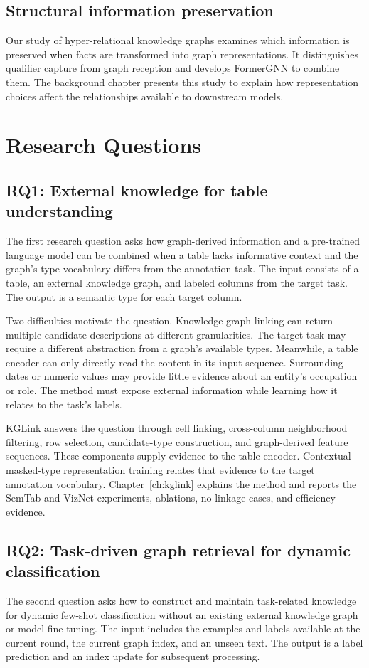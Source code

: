 \subsection{Structural information preservation}
Our study of hyper-relational knowledge graphs examines which information is preserved when facts are transformed into graph representations. It distinguishes qualifier capture from graph reception and develops FormerGNN to combine them. The background chapter presents this study to explain how representation choices affect the relationships available to downstream models.

\section{Research Questions}
\label{sec:introduction:questions}
\subsection{RQ1: External knowledge for table understanding}
The first research question asks how graph-derived information and a pre-trained language model can be combined when a table lacks informative context and the graph's type vocabulary differs from the annotation task. The input consists of a table, an external knowledge graph, and labeled columns from the target task. The output is a semantic type for each target column.

Two difficulties motivate the question. Knowledge-graph linking can return multiple candidate descriptions at different granularities. The target task may require a different abstraction from a graph's available types. Meanwhile, a table encoder can only directly read the content in its input sequence. Surrounding dates or numeric values may provide little evidence about an entity's occupation or role. The method must expose external information while learning how it relates to the task's labels.

KGLink answers the question through cell linking, cross-column neighborhood filtering, row selection, candidate-type construction, and graph-derived feature sequences. These components supply evidence to the table encoder. Contextual masked-type representation training relates that evidence to the target annotation vocabulary. Chapter~\ref{ch:kglink} explains the method and reports the SemTab and VizNet experiments, ablations, no-linkage cases, and efficiency evidence.

\subsection{RQ2: Task-driven graph retrieval for dynamic classification}
The second question asks how to construct and maintain task-related knowledge for dynamic few-shot classification without an existing external knowledge graph or model fine-tuning. The input includes the examples and labels available at the current round, the current graph index, and an unseen text. The output is a label prediction and an index update for subsequent processing.

